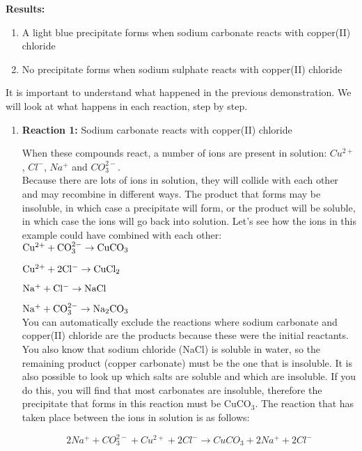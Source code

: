 {\textbf{Results:}

\begin{enumerate}
\item{A light blue precipitate forms when sodium carbonate reacts with copper(II) chloride}
\item{No precipitate forms when sodium sulphate reacts with copper(II) chloride}
\end{enumerate}
}

It is important to understand what happened in the previous demonstration. We will look at what happens in each reaction, step by step.

\begin{enumerate}
\item{\textbf{Reaction 1:} Sodium carbonate reacts with copper(II) chloride

When these compounds react, a number of ions are present in solution: $Cu^{2+}$, $Cl^{-}$, $Na^{+}$ and $CO_{3}^{2-}$.\\

Because there are lots of ions in solution, they will collide with each other and may recombine in different ways. The product that forms may be insoluble, in which case a precipitate will form, or the product will be soluble, in which case the ions will go back into solution. Let's see how the ions in this example could have combined with each other:\\ 

$\rm{Cu^{2+} + CO_{3}^{2-} \rightarrow CuCO_{3}}$

$\rm{Cu^{2+} + 2Cl^{-} \rightarrow CuCl_{2}}$

$\rm{Na^{+} + Cl^{-} \rightarrow NaCl}$

$\rm{Na^{+} + CO_{3}^{2-} \rightarrow Na_{2}CO_{3}}$\\


You can automatically exclude the reactions where sodium carbonate and copper(II) chloride are the products because these were the initial reactants. You also know that sodium chloride (NaCl) is soluble in water, so the remaining product (copper carbonate) must be the one that is insoluble. It is also possible to look up which salts are soluble and which are insoluble. If you do this, you will find that most carbonates are insoluble, therefore the precipitate that forms in this reaction must be CuCO$_{3}$. The reaction that has taken place between the ions in solution is as follows:

\begin{equation*}
2Na^{+} + CO_{3}^{2-} + Cu^{2+} + 2Cl^{-} \rightarrow CuCO_{3} + 2Na^{+} + 2Cl^{-}
\end{equation*}

}
\end{enumerate}
